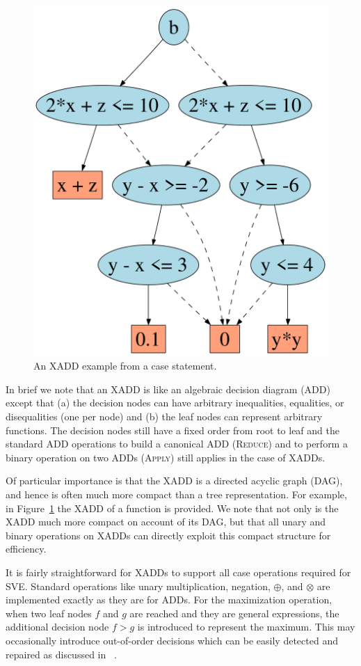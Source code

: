\documentclass[letterpaper]{article}
\begin{document}
{%
\begin{figure}[t!]
\begin{center}
\vspace{-1mm}
\includegraphics[width=.2\textwidth]{norm_unif.pdf}
\end{center}
\vspace{-2mm}
\caption{\footnotesize An XADD example from a case statement.%
} \label{fig:xadd}
\vspace{-4mm}
\end{figure}

In brief we note that an XADD is like an algebraic decision 
diagram (ADD)~\cite{bahar93add} except that (a) the decision
nodes can have arbitrary inequalities, equalities, or disequalities (one
per node) and (b) the leaf nodes can represent arbitrary functions.
The decision nodes still have a fixed order from root to leaf
and the standard ADD
operations to build a canonical ADD (\textsc{Reduce}) and 
to perform a binary operation on two ADDs (\textsc{Apply}) 
still applies in the case of XADDs. 

Of particular importance is that the XADD is a directed acyclic graph
(DAG), and hence is often much more compact than a tree
representation.  For example, in Figure~\ref{fig:xadd} the XADD of a function is provided.
We note that not only is the XADD much more compact on account of its DAG, but that all unary and binary operations on XADDs can directly exploit this compact structure for efficiency.

It is fairly straightforward for XADDs to support all case operations
required for SVE.  Standard operations like unary multiplication,
negation, $\oplus$, and $\otimes$ are implemented exactly as they
are for ADDs.  For the maximization operation, when two leaf
nodes $f$ and $g$ are reached and they are general expressions,
the additional decision node $f > g$ is introduced to represent
the maximum.  This may occasionally introduce out-of-order decisions
which can be easily detected and repaired as discussed in~\cite{uai11} .

}
\end{document}
